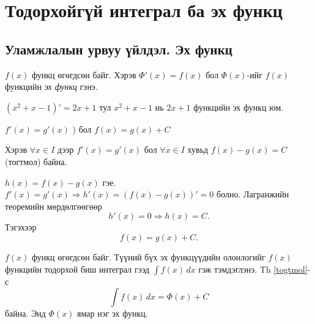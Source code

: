 \chapter{Тодорхойгүй интеграл ба эх функц}

\section{Уламжлалын урвуу үйлдэл. Эх функц}
\begin{definition}
 $f(x)$ функц өгөгдсөн байг. Хэрэв $\Phi'(x)=f(x)$ бол $\Phi(x)$-ийг $f(x)$ функцийн
\emph{эх функц} гэнэ.   
\end{definition}
\begin{example}
    $(x^2+x-1)'=2x+1$ тул $x^2+x-1$ нь $2x+1$ функцийн эх функц юм.
\end{example}
  $f'(x)=g'(x)$ ) бол $f(x)=g(x)+C$
\begin{theorem}\label{togtmol}
   Хэрэв $\forall x\in I$ дээр $f'(x)=g'(x)$ бол $\forall x\in I$ хувьд $f(x)-g(x)=C$ (тогтмол) байна.
 \end{theorem} 
\begin{prof} $h(x)=f(x)-g(x)$ гэе. 
$f'(x)=g'(x) \Rightarrow h'(x)=(f(x)-g(x))'=0$ болно. Лагранжийн теоремийн мөрдөлгөөгөөр   
 $$h'(x)=0 \Rightarrow h(x)=C.$$ Тэгэхээр
\[
f(x)=g(x)+C.
\]
\end{prof}
\begin{definition}
 $f(x)$ функц өгөгдсөн байг. Түүний бүх эх функцүүдийн олонлогийг  $f(x)$ функцийн тодорхой биш интеграл гээд 
 $\displaystyle\int f(x)\,dx$ гэж тэмдэглэнэ. Th \ref{togtmol}-с 
 $$\int f(x)\,dx=\Phi(x)+C$$ байна. Энд $\Phi(x)$  ямар нэг эх функц.
 \end{definition}
